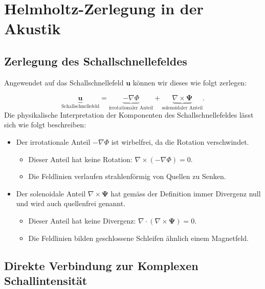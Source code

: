 %
%
%
%
\section{Helmholtz-Zerlegung in der Akustik
\label{helmholtz:section:Helmholtz_Zerlegung_Akustik}}


\subsection{Zerlegung des Schallschnellefeldes
\label{helmholtz:subsection:Zerlegung_Schallschnelle}}
Angewendet auf das Schallschnellefeld $\boldsymbol{u}$ können wir dieses wie folgt zerlegen:
 
\begin{equation}
\underbrace{\boldsymbol{u}}_{\text{Schallschnellefeld}} =  \underbrace{-\nabla \Phi}_{\text{irrotationaler~Anteil}} + \underbrace{\nabla \times \boldsymbol{\Psi}}_{\text{solenoidaler~Anteil}}.
\end{equation}
Die physikalische Interpretation der Komponenten des Schallschnellefeldes lässt sich wie folgt beschreiben:
 
\begin{itemize}
\item Der irrotationale Anteil $-\nabla \Phi$ ist wirbelfrei, da die Rotation verschwindet.
\begin{itemize}
\item Dieser Anteil hat keine Rotation: $\nabla \times (-\nabla \Phi) = 0$.
\item Die Feldlinien verlaufen strahlenförmig von Quellen zu Senken.
\end{itemize}
 
\item Der solenoidale Anteil $\nabla \times \boldsymbol{\Psi}$ hat gemäss der Definition immer Divergenz null und wird auch quellenfrei genannt.
\begin{itemize}
\item Dieser Anteil hat keine Divergenz: $\nabla \cdot (\nabla \times \boldsymbol{\Psi}) = 0$.
\item Die Feldlinien bilden geschlossene Schleifen ähnlich einem Magnetfeld.
\end{itemize}
\end{itemize}

\subsection{Direkte Verbindung zur Komplexen Schallintensität
\label{helmholtz:subsection:Zerlegung_Schallschnelle}}

